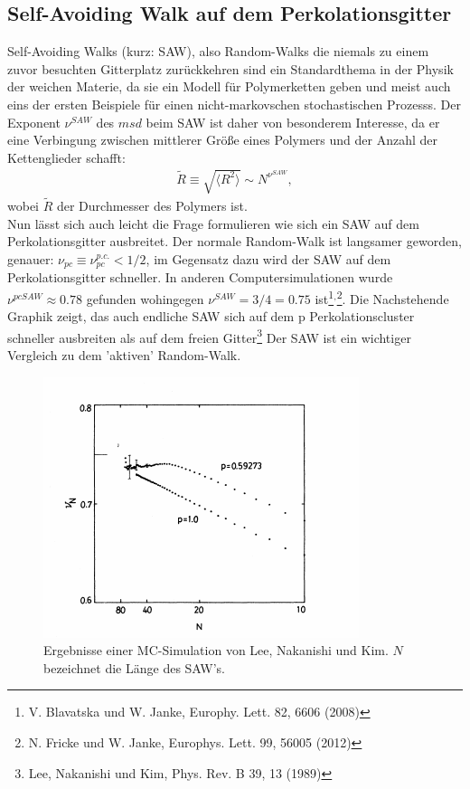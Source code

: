 \documentclass[a4paper, 12pt]{report}
\begin{document}
\newpage


\subsection{Self-Avoiding Walk auf dem Perkolationsgitter}
Self-Avoiding Walks (kurz: SAW), also Random-Walks die niemals zu einem zuvor besuchten Gitterplatz zurückkehren sind ein Standardthema in der Physik der weichen Materie, da sie ein Modell für Polymerketten geben und meist auch eins der ersten Beispiele für einen nicht-markovschen stochastischen Prozesss. Der Exponent $\nu^{SAW}$ des $msd$ beim SAW ist daher von besonderem Interesse, da er eine Verbingung zwischen mittlerer Größe eines Polymers und der Anzahl der Kettenglieder schafft:
\begin{align*}
\tilde R \equiv \sqrt{\langle R^2 \rangle} \sim N^{\nu^{SAW}},
\end{align*} 
wobei $\tilde R$ der Durchmesser des Polymers ist.
\\
Nun lässt sich auch leicht die Frage formulieren wie sich ein SAW auf dem Perkolationsgitter ausbreitet. Der normale Random-Walk ist langsamer geworden, genauer: $\nu_{pc} \equiv \nu_{pc}^{p.c.} < 1/2$, im Gegensatz dazu wird der SAW auf dem Perkolationsgitter schneller. In anderen Computersimulationen wurde $\nu^{pcSAW} \approx 0.78$ gefunden wohingegen $\nu^{SAW}=3/4=0.75$ ist\footnote[5]{V. Blavatska und W. Janke, Europhy. Lett. 82, 6606 (2008)}$^,$\footnote[6]{N. Fricke und W. Janke, Europhys. Lett. 99, 56005 (2012)}. Die Nachstehende Graphik zeigt, das auch endliche SAW sich auf dem p
Perkolationscluster schneller ausbreiten als auf dem freien Gitter\footnote[7]{Lee, Nakanishi und Kim, Phys. Rev. B 39, 13 (1989)} Der SAW ist ein wichtiger Vergleich zu dem 'aktiven' Random-Walk.
\begin{figure}[h!]
	\centering
	\includegraphics[scale=1.2]{saw.png}
	\caption{Ergebnisse einer MC-Simulation von Lee, Nakanishi und Kim. $N$ bezeichnet die Länge des SAW's.}
\end{figure}
\end{document}
